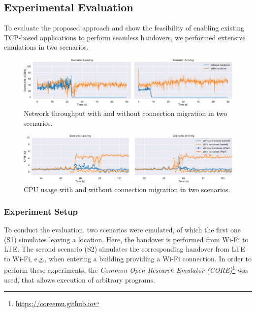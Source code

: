 \subsection{Experimental Evaluation}
To evaluate the proposed approach and show the feasibility of enabling existing TCP-based applications to perform seamless handovers, we performed extensive emulations in two scenarios.


\begin{figure}[tb]
    \centering
    \includegraphics[width=\textwidth]{figures/migration/wg_migration-network.pdf}
    \caption{Network throughput with and without connection migration in two scenarios.}
    \label{fig:eval:mig:network}
\end{figure}
\begin{figure}[tb]
    \centering
    \includegraphics[width=\textwidth]{figures/migration/wg_migration-cpu.pdf}
    \caption{CPU usage with and without connection migration in two scenarios.}
    \label{fig:eval:mig:cpu}
\end{figure}


\subsubsection{Experiment Setup}
To conduct the evaluation, two scenarios were emulated, of which the first one (S1) simulates leaving a location.
Here, the handover is performed from Wi-Fi to LTE.
The second scenario (S2) simulates the corresponding handover from LTE to Wi-Fi, e.g., when entering a building providing a Wi-Fi connection.
In order to perform these experiments, the \emph{Common Open Research Emulator (CORE)}\footnote{\url{https://coreemu.github.io}} was used, that allows execution of arbitrary programs.

